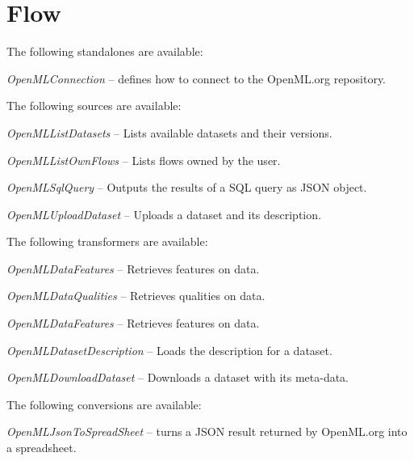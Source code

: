 \documentclass[a4paper]{book}
\begin{document}
\chapter{Flow}
The following standalones are available:
\begin{tight_itemize}
	\item \textit{OpenMLConnection} -- defines how to connect to the OpenML.org repository.
\end{tight_itemize}
The following sources are available:
\begin{tight_itemize}
	\item \textit{OpenMLListDatasets} -- Lists available datasets and their versions.
	\item \textit{OpenMLListOwnFlows} -- Lists flows owned by the user.
	\item \textit{OpenMLSqlQuery} -- Outputs the results of a SQL query as JSON object.
	\item \textit{OpenMLUploadDataset} -- Uploads a dataset and its description.
\end{tight_itemize}
The following transformers are available:
\begin{tight_itemize}
	\item \textit{OpenMLDataFeatures} -- Retrieves features on data.
	\item \textit{OpenMLDataQualities} -- Retrieves qualities on data.
	\item \textit{OpenMLDataFeatures} -- Retrieves features on data.
	\item \textit{OpenMLDatasetDescription} -- Loads the description for a dataset.
	\item \textit{OpenMLDownloadDataset} -- Downloads a dataset with its meta-data.
\end{tight_itemize}
The following conversions are available:
\begin{tight_itemize}
	\item \textit{OpenMLJsonToSpreadSheet} -- turns a JSON result returned by OpenML.org 
	into a spreadsheet.
\end{tight_itemize}

\end{document}
